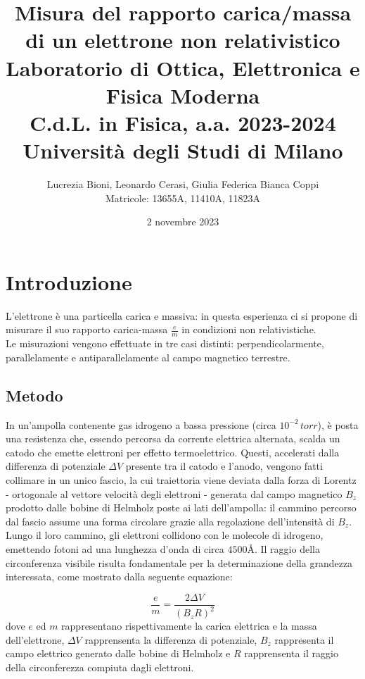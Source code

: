 \documentclass[]{article}
\title{%
    \Huge Misura del rapporto carica/massa di un elettrone non relativistico \\
    \Large Laboratorio di Ottica, Elettronica e Fisica Moderna \\ C.d.L. in Fisica, a.a. 2023-2024 \\ Università degli Studi di Milano}
\author{\LARGE Lucrezia Bioni, Leonardo Cerasi, Giulia Federica Bianca Coppi \\ Matricole: 13655A, 11410A, 11823A}
\date{2 novembre 2023}
\let\oldsection\section%
\renewcommand{\section}{%
	\renewcommand{\theequation}{\thesection.\arabic{equation}}%
	\oldsection}%
\let\oldsubsection\subsection%
\renewcommand{\subsection}{%
	\renewcommand{\theequation}{\thesubsection.\arabic{equation}}%
	\oldsubsection}%
\begin{document}
    \maketitle

    \section{Introduzione}

    L'elettrone è una particella carica e massiva: in questa esperienza ci si propone di misurare il suo rapporto carica-massa $ \frac{e}{m} $ in condizioni non relativistiche. \\
    Le misurazioni vengono effettuate in tre casi distinti: perpendicolarmente, parallelamente e antiparallelamente al campo magnetico terrestre.


    \subsection{Metodo}
    In un'ampolla contenente gas idrogeno a bassa pressione (circa $ 10^{-2}\, torr $), è posta una resistenza che, essendo percorsa da corrente elettrica alternata, scalda un catodo che emette elettroni per effetto termoelettrico. Questi, accelerati dalla differenza di potenziale $\Delta V$ presente tra il catodo e l'anodo, vengono fatti collimare in un unico fascio, la cui traiettoria viene deviata dalla forza di Lorentz - ortogonale al vettore velocità degli elettroni - generata dal campo magnetico $ B_z $ prodotto dalle bobine di Helmholz poste ai lati dell'ampolla: il cammino percorso dal fascio assume una forma circolare grazie alla regolazione dell'intensità di $B_z$. \\

    Lungo il loro cammino, gli elettroni collidono con le molecole di idrogeno, emettendo fotoni ad una lunghezza d'onda di circa $4500 \text{Å}$.
    Il raggio della circonferenza visibile risulta fondamentale per la determinazione della grandezza interessata, come mostrato dalla seguente equazione:

    \begin{equation}
        \label{e_m}
        \frac{e}{m} = \frac{2 \Delta V}{(B_z R)^2}
    \end{equation}
    dove $ e $ ed $ m $ rappresentano rispettivamente la carica elettrica e la massa dell'elettrone, $\Delta V$ rapprensenta la differenza di potenziale, $B_z$ rappresenta il campo elettrico generato dalle bobine di Helmholz e $ R $ rapprensenta il raggio della circonferezza compiuta dagli elettroni. \\
\end{document}
